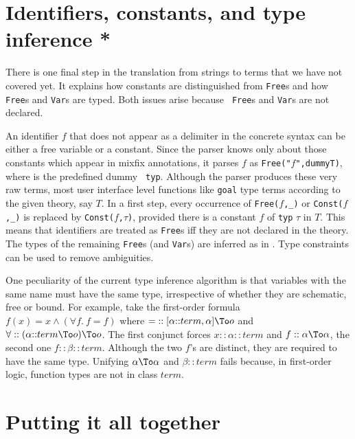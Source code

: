 \section{Identifiers, constants, and type inference *}
\label{Typing}

There is one final step in the translation from strings to terms that we have
not covered yet.  It explains how constants are distinguished from {\tt Free}s
and how {\tt Free}s and {\tt Var}s are typed.  Both issues arise because {\tt
  Free}s and {\tt Var}s are not declared.

An identifier $f$ that does not appear as a delimiter in the concrete syntax
can be either a free variable or a constant.  Since the parser knows only
about those constants which appear in mixfix annotations, it parses $f$ as
{\tt Free("$f$",dummyT)}, where  is the predefined dummy {\tt
  typ}.  Although the parser produces these very raw terms, most user
interface level functions like {\tt goal} type terms according to the given
theory, say $T$.  In a first step, every occurrence of {\tt Free($f$,_)} or
{\tt Const($f$,_)} is replaced by {\tt Const($f$,$\tau$)}, provided there is
a constant $f$ of {\tt typ} $\tau$ in $T$.  This means that identifiers are
treated as {\tt Free}s iff they are not declared in the theory.  The types of
the remaining {\tt Free}s (and {\tt Var}s) are inferred as in \ML.  Type
constraints can be used to remove ambiguities.

One peculiarity of the current type inference algorithm is that variables
with the same name must have the same type, irrespective of whether they are
schematic, free or bound.  For example, take the first-order formula $f(x) = x
\land (\forall f.~ f=f)$ where ${=} :: [\alpha{::}term,\alpha]\To o$ and
$\forall :: (\alpha{::}term\To o)\To o$.  The first conjunct forces
$x::\alpha{::}term$ and $f::\alpha\To\alpha$, the second one
$f::\beta{::}term$.  Although the two $f$'s are distinct, they are required to
have the same type.  Unifying $\alpha\To\alpha$ and $\beta{::}term$ fails
because, in first-order logic, function types are not in class $term$.


\section{Putting it all together}

